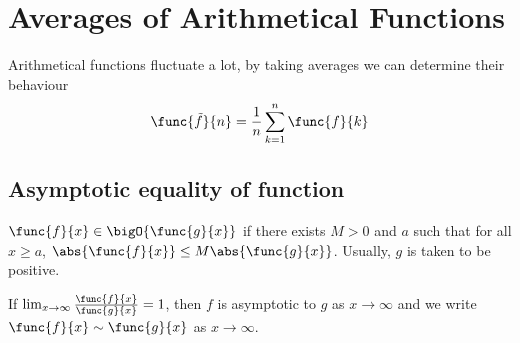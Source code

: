 \chapter{Averages of Arithmetical Functions}
Arithmetical functions fluctuate a lot, by taking averages we can determine their behaviour
\begin{equation*}
    \func{\tilde{f}}{n} = \frac{1}{n} \sum_{k = 1}^n \func{f}{k}
\end{equation*}
\section{Asymptotic equality of function}
\(\func{f}{x} \in \bigO{\func{g}{x}}\) if there exists \(M > 0\) and \(a\) such that for all \(x \geq a\), \(\abs{\func{f}{x}} \leq M \abs{\func{g}{x}}\). Usually, \(g\) is taken to be positive.
\begin{definition}
    If \(\lim_{x \to \infty } \frac{\func{f}{x}}{\func{g}{x}} = 1\), then \(f\) is asymptotic to \(g\) as \(x \to \infty\) and we write \(\func{f}{x} \sim \func{g}{x}\) as \(x \to \infty\).
\end{definition}
